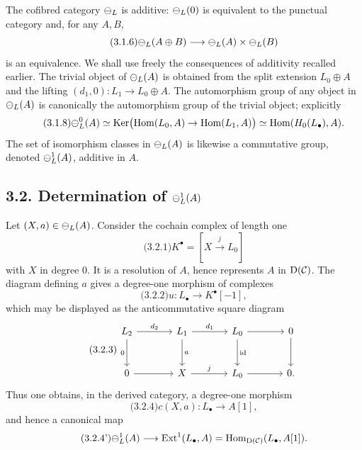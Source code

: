 \documentclass[11pt]{article}
\providecommand{\Ker}{\operatorname{Ker}}
\providecommand{\Hom}{\operatorname{Hom}}
\providecommand{\Ext}{\operatorname{Ext}}
\providecommand{\id}{\operatorname{id}}
\begin{document}
The cofibred category \(\mathcal\Psi_L\) is additive: \(\mathcal\Psi_L(0)\) is equivalent to the punctual category and, for any \(A,B\),
\begin{equation}\qquad\text{(3.1.6)}
  \mathcal\Psi_L(A\oplus B)\longrightarrow \mathcal\Psi_L(A)\times\mathcal\Psi_L(B)
\end{equation}
is an equivalence.  We shall use freely the consequences of additivity recalled earlier.  The trivial object of \(\mathcal\Psi_L(A)\) is obtained from the split extension \(L_0\oplus A\) and the lifting \((d_1,0):L_1\to L_0\oplus A\).  The automorphism group of any object in \(\mathcal\Psi_L(A)\) is canonically the automorphism group of the trivial object; explicitly
\begin{equation}\qquad\text{(3.1.8)}
  \cPsi^0_L(A)
  \simeq \Ker\bigl(\Hom(L_0,A)\to\Hom(L_1,A)\bigr)
  \simeq \Hom(H_0(L_\bullet),A).
\end{equation}
The set of isomorphism classes in \(\mathcal\Psi_L(A)\) is likewise a commutative group, denoted \(\mathcal\Psi^1_L(A)\), additive in \(A\).

\subsection*{3.2. Determination of \(\mathcal\Psi_L^1(A)\)}
Let \((X,a)\in\mathcal\Psi_L(A)\).  Consider the cochain complex of length one
\begin{equation}\qquad\text{(3.2.1)}
  K^\bullet=[X\xrightarrow{j}L_0]
\end{equation}
with \(X\) in degree \(0\).  It is a resolution of \(A\), hence represents \(A\) in \(\mathrm D(\mathcal C)\).  The diagram defining \(a\) gives a degree-one morphism of complexes
\begin{equation}\qquad\text{(3.2.2)}
  u:L_\bullet\longrightarrow K^\bullet[-1],
\end{equation}
which may be displayed as the anticommutative square diagram
\begin{equation}\qquad\text{(3.2.3)}
\begin{tikzcd}[column sep=large,row sep=large]
 L_2\arrow[r,"d_2"]\arrow[d,"0"']&L_1\arrow[r,"d_1"]\arrow[d,"a"]&L_0\arrow[d,"\id"]\arrow[r]&0\arrow[d]\\
 0\arrow[r]&X\arrow[r,"j"]&L_0\arrow[r]&0 .
\end{tikzcd}
\end{equation}
Thus one obtains, in the derived category, a degree-one morphism
\begin{equation}\qquad\text{(3.2.4)}
  c(X,a):L_\bullet\longrightarrow A[1],
\end{equation}
and hence a canonical map
\begin{equation}\qquad\text{(3.2.4')}
  \cPsi_L^1(A)\longrightarrow \Ext^1(L_\bullet,A)
  =\Hom_{\Dcat(\cC)}(L_\bullet,A[1]).
\end{equation}
\end{document}
